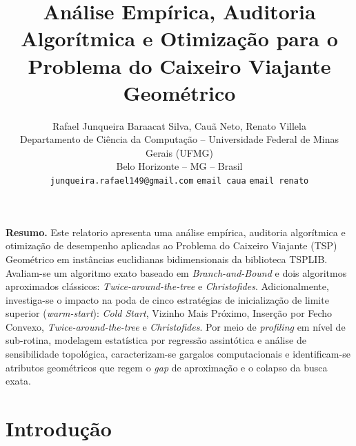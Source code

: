 \documentclass[12pt]{article}
\title{\textbf{Análise Empírica, Auditoria Algorítmica e Otimização para o Problema do Caixeiro Viajante Geométrico}}
\author{
    Rafael Junqueira Baraacat Silva, Cauã Neto, Renato Villela \\
    \small Departamento de Ciência da Computação -- Universidade Federal de Minas Gerais (UFMG) \\
    \small Belo Horizonte -- MG -- Brasil \\
    \small \texttt{junqueira.rafael149@gmail.com}
    \small \texttt{email caua}
    \small \texttt{email renato}
}
\begin{document}
\maketitle

\noindent\textbf{Resumo.} Este relatorio apresenta uma análise empírica, auditoria algorítmica e otimização de desempenho aplicadas ao Problema do Caixeiro Viajante (TSP) Geométrico em instâncias euclidianas bidimensionais da biblioteca TSPLIB. Avaliam-se um algoritmo exato baseado em \textit{Branch-and-Bound} e dois algoritmos aproximados clássicos: \textit{Twice-around-the-tree} e \textit{Christofides}. Adicionalmente, investiga-se o impacto na poda de cinco estratégias de inicialização de limite superior (\textit{warm-start}): \textit{Cold Start}, Vizinho Mais Próximo, Inserção por Fecho Convexo, \textit{Twice-around-the-tree} e \textit{Christofides}. Por meio de \textit{profiling} em nível de sub-rotina, modelagem estatística por regressão assintótica e análise de sensibilidade topológica, caracterizam-se gargalos computacionais e identificam-se atributos geométricos que regem o \textit{gap} de aproximação e o colapso da busca exata.

\section{Introdução}




\end{document}
